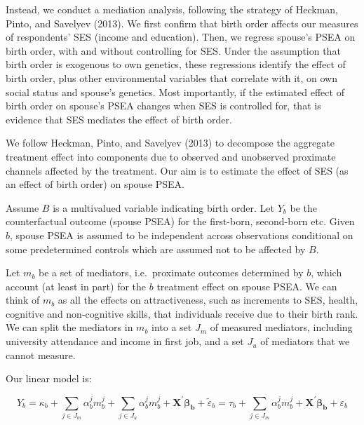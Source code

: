 \documentclass[
]{article}
\theoremstyle{definition}
\theoremstyle{definition}
\theoremstyle{definition}
\theoremstyle{definition}
\theoremstyle{remark}
\begin{document}
Instead, we conduct a mediation analysis, following the strategy of
Heckman, Pinto, and Savelyev (2013). We first confirm that birth order affects our
measures of respondents' SES (income and education). Then, we regress spouse's
PSEA on birth order, with and without controlling for SES. Under the assumption
that birth order is exogenous to own genetics, these regressions identify the
effect of birth order, plus other environmental variables that correlate with
it, on own social status and spouse's genetics. Most importantly, if the
estimated effect of birth order on spouse's PSEA changes when SES is controlled
for, that is evidence that SES mediates the effect of birth order.

We follow Heckman, Pinto, and Savelyev (2013) to decompose the aggregate treatment
effect into components due to observed and unobserved proximate channels
affected by the treatment. Our aim is to estimate the effect of SES (as
an effect of birth order) on spouse PSEA.

Assume \(B\) is a multivalued variable indicating birth order. Let \(Y_b\) be
the counterfactual outcome (spouse PSEA) for the first-born, second-born etc.
Given \(b\), spouse PSEA is assumed to be independent across observations
conditional on some predetermined controls which are assumed not to be affected
by \(B\).

Let \(m_{b}\) be a set of mediators, i.e.~proximate outcomes
determined by \(b\), which account (at least in part) for the \(b\)
treatment effect on spouse PSEA. We can think of \(m_{b}\) as all
the effects on attractiveness, such as increments to SES, health,
cognitive and non-cognitive skills, that individuals receive due to
their birth rank. We can split the mediators in \(m_b\) into a set \(J_m\) of
measured mediators, including university attendance and income in first job,
and a set \(J_u\) of mediators that we cannot measure.

Our linear model is:

\begin{equation}
\label{eq:linear-model}
Y_b = \kappa_b + \sum_{j \in J_m} \alpha_b^j m^j_b+\sum_{j \in J_u} \alpha_b^j m^j_b + \mathbf{X^\prime} \symbf{\beta_b} + \tilde{\varepsilon}_b = \tau_b + \sum_{j \in J_m} \alpha_b^j m^j_b + \mathbf{X^\prime} \symbf{\beta_b} + \varepsilon_b 
\end{equation}
\end{document}
